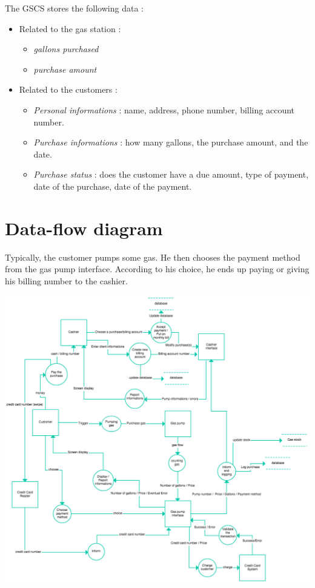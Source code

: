 \documentclass[11pt, a4paper]{article}
\newcommand{\data}[1]{\textit{#1}}
\begin{document}
The GSCS stores the following data :
\begin{itemize}
\item Related to the gas station :
		\begin{itemize}
		\item \data{gallons purchased}
		\item \data{purchase amount}
		\end{itemize}

\item Related to the customers :
		\begin{itemize}
		\item \data{Personal informations} : name, address, phone number, billing account number.
		\item \data{Purchase informations} : how many gallons, the purchase amount, and the date.
		\item \data{Purchase status} : does the customer have a due amount, type of payment, date of the purchase, date of the payment.
		\end{itemize}
\end{itemize}


\newpage
\section{Data-flow diagram}

Typically, the customer pumps some gas. He then chooses the payment method from the gas pump interface. According to his choice, he ends up paying or giving his billing number to the cashier.

\begin{center}
\centerline{\includegraphics[width=1.4\textwidth]{dataflow_diagram.pdf}}
\end{center}
\end{document}
